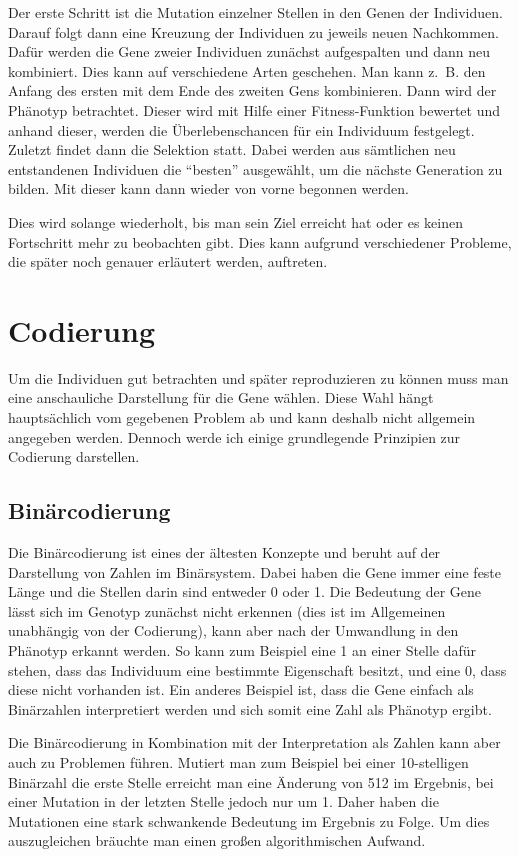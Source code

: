 Der erste Schritt ist die Mutation einzelner Stellen in den Genen der Individuen.
Darauf folgt dann eine Kreuzung der Individuen zu jeweils neuen Nachkommen. Dafür werden die Gene zweier Individuen zunächst aufgespalten und dann neu kombiniert. Dies kann auf verschiedene Arten geschehen. Man kann z.~B. den Anfang des ersten mit dem Ende des zweiten Gens kombinieren.
Dann wird der Phänotyp betrachtet. Dieser wird mit Hilfe einer Fitness-Funktion bewertet und anhand dieser, werden die Überlebenschancen für ein Individuum festgelegt.
Zuletzt findet dann die Selektion statt. Dabei werden aus sämtlichen neu entstandenen Individuen die "`besten"' ausgewählt, um die nächste Generation zu bilden. Mit dieser kann dann wieder von vorne begonnen werden.

Dies wird solange wiederholt, bis man sein Ziel erreicht hat oder es keinen Fortschritt mehr zu beobachten gibt. Dies kann aufgrund verschiedener Probleme, die später noch genauer erläutert werden, auftreten.

\section{Codierung}
Um die Individuen gut betrachten und später reproduzieren zu können muss man eine anschauliche Darstellung für die Gene wählen. Diese Wahl hängt hauptsächlich vom gegebenen Problem ab und kann deshalb nicht allgemein angegeben werden. Dennoch werde ich einige grundlegende Prinzipien zur Codierung darstellen.

\subsection{Binärcodierung}
Die Binärcodierung ist eines der ältesten Konzepte und beruht auf der Darstellung von Zahlen im Binärsystem. Dabei haben die Gene immer eine feste Länge und die Stellen darin sind entweder 0 oder 1. Die Bedeutung der Gene lässt sich im Genotyp zunächst nicht erkennen (dies ist im Allgemeinen unabhängig von der Codierung), kann aber nach der Umwandlung in den Phänotyp erkannt werden. So kann zum Beispiel eine 1 an einer Stelle dafür stehen, dass das Individuum eine bestimmte Eigenschaft besitzt, und eine 0, dass diese nicht vorhanden ist. Ein anderes Beispiel ist, dass die Gene einfach als Binärzahlen interpretiert werden und sich somit eine Zahl als Phänotyp ergibt.

Die Binärcodierung in Kombination mit der Interpretation als Zahlen kann aber auch zu Problemen führen. Mutiert man zum Beispiel bei einer 10-stelligen Binärzahl die erste Stelle erreicht man eine Änderung von 512 im Ergebnis, bei einer Mutation in der letzten Stelle jedoch nur um 1. Daher haben die Mutationen eine stark schwankende Bedeutung im Ergebnis zu Folge. Um dies auszugleichen bräuchte man einen großen algorithmischen Aufwand.

